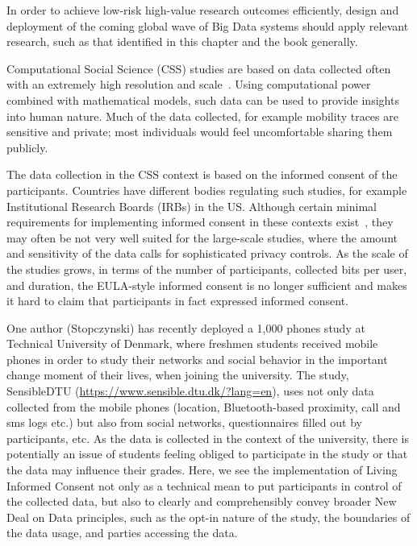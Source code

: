 In order to achieve low-risk high-value research outcomes efficiently, design and deployment of the coming global wave of Big Data systems should apply relevant research, such as that identified in this chapter and the book generally.

Computational Social Science (CSS) studies are based on data collected often with an extremely high resolution and scale~\cite{lazer2009life}.
Using computational power combined with mathematical models, such data can be used to provide insights into human nature.
Much of the data collected, for example mobility traces are sensitive and private; most individuals would feel uncomfortable sharing them publicly.

The data collection in the CSS context is based on the informed consent of the participants. 
Countries have different bodies regulating such studies, for example Institutional Research Boards (IRBs) in the US.
Although certain minimal requirements for implementing informed consent in these contexts exist~\cite{IMM2013-06632}, they may often be not very well suited for the large-scale studies, where the amount and sensitivity of the data calls for sophisticated privacy controls.
As the scale of the studies grows, in terms of the number of participants, collected bits per user, and duration, the EULA-style informed consent is no longer sufficient and makes it hard to claim that participants in fact expressed informed consent.

One author (Stopczynski) has recently deployed a 1,000 phones study at Technical University of Denmark, where freshmen students received mobile phones in order to study their networks and social behavior in the important change moment of their lives, when joining the university.
The study, SensibleDTU (\url{https://www.sensible.dtu.dk/?lang=en}), uses not only data collected from the mobile phones (location, Bluetooth-based proximity, call and sms logs etc.) but also from social networks, questionnaires filled out by participants, etc.
As the data is collected in the context of the university, there is potentially an issue of students feeling obliged to participate in the study or that the data may influence their grades.
Here, we see the implementation of Living Informed Consent not only as a technical mean to put participants in control of the collected data, but also to clearly and comprehensibly convey broader New Deal on Data principles, such as the opt-in nature of the study, the boundaries of the data usage, and parties accessing the data.

